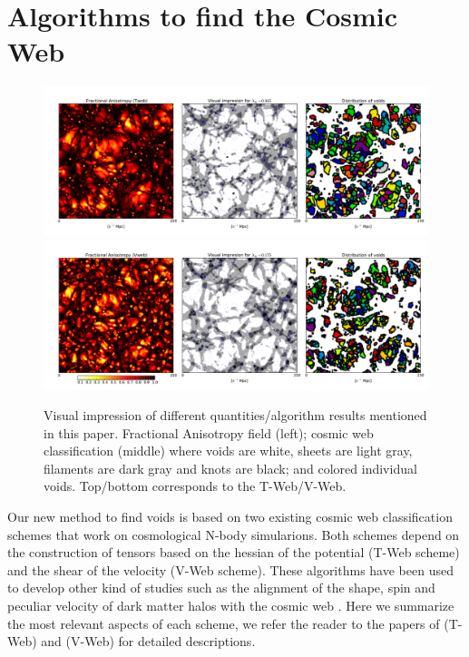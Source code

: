 \documentclass[a4,useAMS,usenatbib,usegraphicx]{mn2e}
\begin{document}
\section{Algorithms to find the Cosmic Web}
\label{sec:algorithms_cosmic_web}


\begin{figure}
  \includegraphics[trim = 16mm 8mm 5mm 12mm, clip, keepaspectratio=true,
  width=0.73\textheight]{cosmicweb_FA_Tweb.pdf}
  \includegraphics[trim = 16mm 8mm 5mm 12mm, clip, keepaspectratio=true,
  width=0.73\textheight]{cosmicweb_FA_Vweb.pdf}
  \caption{Visual impression of different quantities/algorithm results
    mentioned in this paper. Fractional Anisotropy field
    (left); cosmic web classification (middle) where voids are white,
    sheets are light gray, filaments are dark gray and knots are
    black; and colored individual voids. Top/bottom corresponds to the 
    T-Web/V-Web.}
  \label{fig:FA_field}
\end{figure}

Our new method to find voids is based on two existing cosmic web
classification schemes that work on cosmological N-body simularions.
Both schemes depend on the construction of tensors based on the
hessian of the potential (T-Web scheme) and the shear of the velocity
(V-Web scheme). 
These algorithms have been used to develop other
kind of studies such as the alignment of the shape, spin and peculiar
velocity of dark matter halos with the cosmic web
\citep{Libeskind13,Forero2014}. 
Here we summarize the most relevant aspects of each scheme, we refer
the reader to the papers of \cite{Forero09} (T-Web) and
\cite{Hoffman12} (V-Web) for detailed descriptions. 
\end{document}
